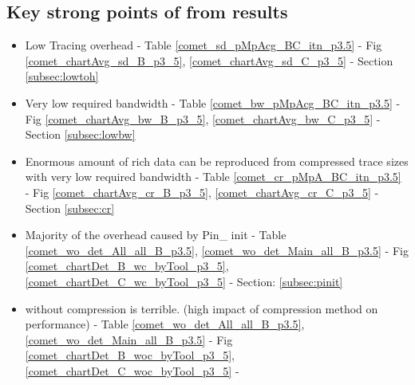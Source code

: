 \subsection{Key strong points of \parlot from results}

\begin{itemize}
\item Low Tracing overhead - Table \ref{comet_sd_pMpAcg_BC_itn_p3.5} - Fig \ref{comet_chartAvg_sd_B_p3_5}, \ref{comet_chartAvg_sd_C_p3_5} - Section \ref{subsec:lowtoh}
\item Very low required bandwidth - Table \ref{comet_bw_pMpAcg_BC_itn_p3.5} - Fig \ref{comet_chartAvg_bw_B_p3_5}, \ref{comet_chartAvg_bw_C_p3_5} - Section \ref{subsec:lowbw}
\item Enormous amount of rich data can be reproduced from compressed trace sizes with very low required bandwidth - Table \ref{comet_cr_pMpA_BC_itn_p3.5} - Fig \ref{comet_chartAvg_cr_B_p3_5}, \ref{comet_chartAvg_cr_C_p3_5} - Section \ref{subsec:cr}
\item Majority of the overhead caused by Pin\_ init - Table \ref{comet_wo_det_All_all_B_p3.5}, \ref{comet_wo_det_Main_all_B_p3.5} - Fig \ref{comet_chartDet_B_wc_byTool_p3_5}, \ref{comet_chartDet_C_wc_byTool_p3_5} - Section: \ref{subsec:pinit}
\item \parlot without compression is terrible. (high impact of compression method on performance) - Table \ref{comet_wo_det_All_all_B_p3.5}, \ref{comet_wo_det_Main_all_B_p3.5}  - Fig \ref{comet_chartDet_B_woc_byTool_p3_5}, \ref{comet_chartDet_C_woc_byTool_p3_5} - \cite{subsec:compact}
\end{itemize}

